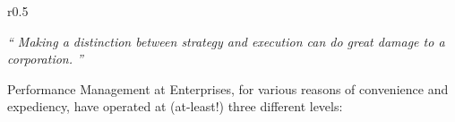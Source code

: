 %
%

\begin{wrapfigure}[3]{r}{0.5\textwidth}
    \vspace{-42pt}
    \begin{center}
        \begin{tcolorbox}[colback=secondary!5,colframe=secondary!60,left=2pt,right=2pt]
            \itshape\large\enquote{%
                Making a distinction between strategy and execution can do great damage to a corporation.%
            }%
            \begin{flushright}\textcite{the_execution_trap}\end{flushright}%
        \end{tcolorbox}
    \end{center}
\end{wrapfigure}

Performance Management at Enterprises, for various reasons of convenience and expediency, 
have operated at (at-least!) three different levels:

